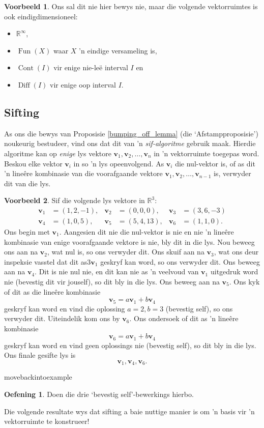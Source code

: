 \documentclass[a4paper,11pt]{book}
\theoremstyle{definition}
\newtheorem{exercise}{Oefening}
\newtheorem{example_environment}{Voorbeeld}[chapter]
\newcommand{\ve}[1]{\mathbf{#1}}
\newenvironment{example}
	{
		\begin{oframed}
		\begin{example_environment}
	}
	{
		\end{example_environment}
		\end{oframed}
	}
\DeclareMathOperator{\Fun}{Fun}
\DeclareMathOperator{\Cont}{Cont}
\DeclareMathOperator{\Diff}{Diff}
\begin{document}
\begin{example} Ons sal dit nie hier bewys nie, maar die volgende
	vektorruimtes is ook eindigdimensioneel:
	\begin{itemize}
		\item $\mathbb{R}^\infty$,
		\item $\Fun(X)$ waar $X$ 'n eindige versameling is,
		\item $\Cont(I)$ vir enige nie-le{\"e} interval $I$ en
		\item $\Diff(I)$ vir enige oop interval $I$.
	\end{itemize}
\end{example}


\subsection{Sifting} \label{sifting_subsection}
As ons die bewys van Proposisie \ref{bumping_off_lemma} (die
`Afstampproposisie') noukeurig bestudeer, vind ons dat dit van 'n
\emph{sif-algoritme} gebruik maak. Hierdie algoritme kan op \emph{enige}
lys vektore $\ve{v}_1, \ve{v}_2, \ldots, \ve{v}_n$ in 'n vektorruimte
toegepas word. Beskou elke vektor $\ve{v}_i$ in so 'n lys
opeenvolgend. As $\ve{v}_i$ die nul-vektor is, of as dit 'n line{\^e}re
kombinasie van die voorafgaande vektore $\ve{v}_1, \ve{v}_2, \ldots,
\ve{v}_{n-1}$ is, verwyder dit van die lys.

\begin{example} Sif die volgende lys vektore in $\mathbb{R}^3$:
	\begin{align*}
		\ve{v}_1 &= (1,2,-1), & \ve{v}_2 &= (0, 0, 0), & \ve{v}_3 &= (3, 6,
		-3) \\
		\ve{v}_4 &= (1, 0, 5), & \ve{v}_5 &= (5, 4, 13), &  \ve{v}_6 &= (1,
		1, 0).
	\end{align*}
	Ons begin met $\ve{v}_1$. Aangesien dit nie die nul-vektor is nie en
	nie 'n line{\^e}re kombinasie van enige voorafgaande vektore is nie,
	bly dit in die lys. Nou beweeg ons aan na $\ve{v}_2$, wat nul is, so
	ons verwyder dit. Ons skuif aan na $\ve{v}_3$, wat ons deur inspeksie
	vasstel dat dit as$3 \ve{v}_1$ geskryf kan word, so ons verwyder dit.
	Ons beweeg aan na $\ve{v}_4$. Dit is nie nul nie, en dit kan nie as 'n
	veelvoud van $\ve{v}_1$ uitgedruk word nie (bevestig dit vir jouself),
	so dit bly in die lys. Ons beweeg aan na $\ve{v}_5$. Ons kyk of dit as
	die line{\^e}re kombinasie 
	\[
		\ve{v}_5 = a\ve{v}_1 + b \ve{v}_4
	\] 
	geskryf kan word en vind die oplossing $a=2, b=3$ (bevestig self), so
	ons verwyder dit. Uiteindelik kom ons by $\ve{v}_6$. Ons ondersoek of
	dit as 'n line{\^e}re kombinasie
	\[
		\ve{v}_6 = a\ve{v}_1 + b \ve{v}_4
	\] 
	geskryf kan word en vind geen oplossings nie (bevestig self), so dit
	bly in die lys. Ons finale gesifte lys is
	\[
		\ve{v}_1, \ve{v}_4, \ve{v}_6.
	\]

\end{example}movebackintoexample
	\begin{exercise} Doen die drie `bevestig self'-bewerkings hierbo.
\end{exercise}
Die volgende resultate wys dat sifting a baie nuttige manier is om 'n basis
vir 'n vektorruimte te konstrueer!
\end{document}
